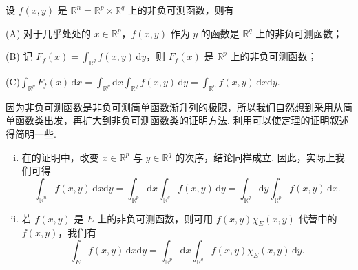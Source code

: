 \documentclass[../../main.tex]{subfiles}
\begin{document}
\begin{theorem}\label{theorem:Tonelli 定理 非负可测函数的情形}
设 \( f(x, y) \) 是 \( \mathbb{R}^n = \mathbb{R}^p \times \mathbb{R}^q \) 上的非负可测函数，则有

(A) 对于几乎处处的 \( x \in \mathbb{R}^p \)，\( f(x, y) \) 作为 \( y \) 的函数是 \( \mathbb{R}^q \) 上的非负可测函数；

(B) 记 \( F_f(x) = \int_{\mathbb{R}^q} f(x, y) \, \mathrm{d}y \)，则 \( F_f(x) \) 是 \( \mathbb{R}^p \) 上的非负可测函数；

(C)$\int_{\mathbb{R}^p} F_f(x) \, \mathrm{d}x = \int_{\mathbb{R}^p} \mathrm{d}x \int_{\mathbb{R}^q} f(x, y) \, \mathrm{d}y = \int_{\mathbb{R}^n} f(x, y) \, \mathrm{d}x\mathrm{d}y.$
\end{theorem}
\begin{note}
因为非负可测函数是非负可测简单函数渐升列的极限，所以我们自然想到采用从简单函数类出发，再扩大到非负可测函数类的证明方法. 利用可以使定理的证明叙述得简明一些. 
\end{note}
\begin{remark}
\begin{enumerate}[(i)]
\item 在的证明中，改变 \( x \in \mathbb{R}^p \) 与 \( y \in \mathbb{R}^q \) 的次序，结论同样成立. 因此，实际上我们可得
\[
\int_{\mathbb{R}^n} f(x, y) \, \mathrm{d}x\mathrm{d}y = \int_{\mathbb{R}^p} \mathrm{d}x \int_{\mathbb{R}^q} f(x, y) \, \mathrm{d}y = \int_{\mathbb{R}^q} \mathrm{d}y \int_{\mathbb{R}^p} f(x, y) \, \mathrm{d}x.
\]

\item 若 \( f(x, y) \) 是 \( E \) 上的非负可测函数，则可用 \( f(x, y) \chi_E(x, y) \) 代替中的 \( f(x, y) \)，我们有
\[
\int_E f(x, y) \, \mathrm{d}x\mathrm{d}y = \int_{\mathbb{R}^p} \mathrm{d}x \int_{\mathbb{R}^q} f(x, y) \chi_E(x, y) \, \mathrm{d}y.
\]
\end{enumerate}
\end{remark}
\end{document}
